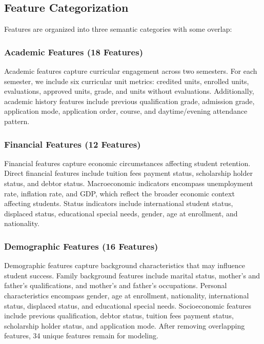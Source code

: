 \documentclass[journal]{IEEEtran}
\begin{document}
\subsection{Feature Categorization}

Features are organized into three semantic categories with some overlap:

\subsubsection{Academic Features (18 Features)}

Academic features capture curricular engagement across two semesters. For each semester, we include six curricular unit metrics: credited units, enrolled units, evaluations, approved units, grade, and units without evaluations. Additionally, academic history features include previous qualification grade, admission grade, application mode, application order, course, and daytime/evening attendance pattern.

\subsubsection{Financial Features (12 Features)}

Financial features capture economic circumstances affecting student retention. Direct financial features include tuition fees payment status, scholarship holder status, and debtor status. Macroeconomic indicators encompass unemployment rate, inflation rate, and GDP, which reflect the broader economic context affecting students. Status indicators include international student status, displaced status, educational special needs, gender, age at enrollment, and nationality.

\subsubsection{Demographic Features (16 Features)}

Demographic features capture background characteristics that may influence student success. Family background features include marital status, mother's and father's qualifications, and mother's and father's occupations. Personal characteristics encompass gender, age at enrollment, nationality, international status, displaced status, and educational special needs. Socioeconomic features include previous qualification, debtor status, tuition fees payment status, scholarship holder status, and application mode. After removing overlapping features, 34 unique features remain for modeling.
\end{document}
